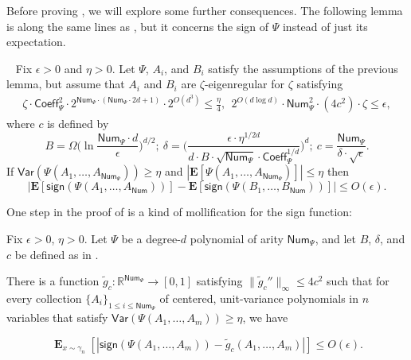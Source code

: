 \documentclass{toc}
\begin{document}
Before proving , we will explore some further consequences.
The following lemma is along the same lines as ,
but it concerns the sign of $\Psi$ instead of just its expectation.

\begin{lemma}~\label{lem:sign-match}
    Fix $\epsilon > 0$ and $\eta > 0$.
    Let $\Psi$, $A_i$, and $B_i$ satisfy the assumptions of the previous lemma, but
    assume that $A_i$ and $B_i$ are $\zeta$-eigenregular for $\zeta$ satisfying
    \begin{eqnarray*}
    \zeta \cdot \mathsf{Coeff}^2_\Psi \cdot 2^{\mathsf{Num}_\Psi \cdot (\mathsf{Num}_\Psi \cdot 2d+1)} \cdot 2^{O(d^3)} \leq \frac{\eta}{4} , \ \ 
     2^{O(d \log d)} \cdot \mathsf{Num}_{\Psi}^2 \cdot (4c^2) \cdot \zeta \le \epsilon,
    \end{eqnarray*}
    where $c$ is defined by
    \[
    B = \Omega\bigg( \ln  \frac{\mathsf{Num}_\Psi \cdot d}{\epsilon} \bigg)^{d/2} ;  \ \delta = \bigg( \frac{\epsilon \cdot \eta^{1/2d}}{d \cdot B \cdot \sqrt{\mathsf{Num}_\Psi} \cdot \mathsf{Coeff}_\Psi^{1/d}} \bigg)^d; \   c = \frac{\mathsf{Num_\Psi}}{\delta \cdot \sqrt{\epsilon}}.
    \]
    If $\mathsf{Var}(\Psi(A_1, \ldots,
    A_{\mathsf{Num}_\Psi})) \ge \eta$ and $|\mathbf{E}[\Psi(A_1, \ldots,
    A_{\mathsf{Num}_\Psi})]| \le \eta$ then
    \[
        |\mathbf{E}[\mathsf{sign}(\Psi(A_1, \ldots, A_{\mathsf{Num}}))] - \mathbf{E}[\mathsf{sign}(\Psi(B_1, \ldots, B_{\mathsf{Num}}))]| \le O(\epsilon).
    \]
\end{lemma}

One step in the proof of  is a kind of mollification for the sign function:

\begin{lemma}\label{lem:mollification}
    Fix $\epsilon > 0$, $\eta > 0$. Let $\Psi$ be a degree-$d$ polynomial of
    arity $\mathsf{Num}_\Psi$, and
    let $B$, $\delta$, and $c$ be defined as in .

    There is a function $\tilde{g}_c: \mathbb{R}^{\mathsf{Num}_\Psi}
    \rightarrow [0,1]$ satisfying $\|\tilde g_c''\|_\infty \le 4 c^2$ such that
    for every collection $\{A_i\}_{1 \le i \le \mathsf{Num}_\Psi}$ of centered,
    unit-variance polynomials in $n$ variables that satisfy
    $\mathsf{Var}(\Psi(A_1, \ldots, A_m)) \ge \eta$, we have

\[
\mathop{\mathbf{E}}_{x \sim \gamma_n} [|\mathsf{sign}(\Psi(A_1, \ldots, A_m)) - \tilde{g}_c(A_1, \ldots, A_m)|] \le O(\epsilon). 
\]
\end{lemma}
\end{document}
